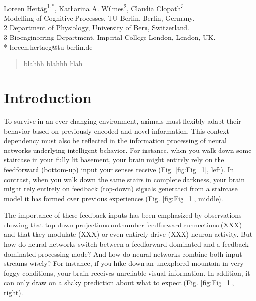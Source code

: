 \documentclass[10pt,a4paper,draft]{article}
\begin{document}
\thispagestyle{empty}

\begin{flushleft}
{\Large
\textbf{}
}
\newline
\\
Loreen Hert\"ag\textsuperscript{1,*},
Katharina A. Wilmes\textsuperscript{2},
Claudia Clopath\textsuperscript{3}
\\
 Modelling of Cognitive Processes, TU Berlin, Berlin, Germany.\\
2 Department of Physiology, University of Bern, Switzerland.\\
3 Bioengineering Department, Imperial College London, London, UK.
\\
\bigskip
* loreen.hertaeg@tu-berlin.de

\end{flushleft}


\begin{abstract}
blahhh blahhh blah
\end{abstract}

\section*{Introduction}
%
To survive in an ever-changing environment, animals must flexibly adapt their behavior based on previously encoded and novel information. This context-dependency must also be reflected in the information processing of neural networks underlying intelligent behavior. For instance, when you walk down some staircase in your fully lit basement, your brain might entirely rely on the feedforward (bottom-up) input your senses receive (Fig. \ref{fig:Fig_1}, left). In contrast, when you walk down the same stairs in complete darkness, your brain might rely entirely on feedback (top-down) signals generated from a staircase model it has formed over previous experiences (Fig. \ref{fig:Fig_1}, middle). 

The importance of these feedback inputs has been emphasized by observations showing that top-down projections outnumber feedforward connections (XXX) and that they modulate (XXX) or even entirely drive (XXX) neuron activity. But how do neural networks switch between a feedforward-dominated and a feedback-dominated processing mode? And how do neural networks combine both input streams wisely? For instance, if you hike down an unexplored mountain in very foggy conditions, your brain receives unreliable visual information. In addition, it can only draw on a shaky prediction about what to expect (Fig. \ref{fig:Fig_1}, right). 
\end{document}
